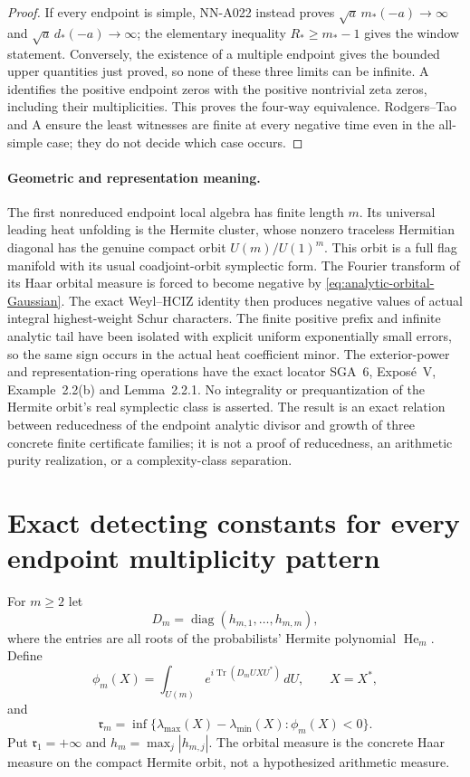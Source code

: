\begin{proof}
If every endpoint is simple, NN-A022 instead proves
$\sqrt a\,m_*(-a)\to\infty$ and
$\sqrt a\,d_*(-a)\to\infty$; the elementary inequality
$R_*\ge m_*-1$ gives the window statement. Conversely, the existence
of a multiple endpoint gives the bounded upper quantities just proved,
so none of these three limits can be infinite. A identifies the
positive endpoint zeros with the positive nontrivial zeta zeros,
including their multiplicities. This proves the four-way equivalence.
Rodgers--Tao and A ensure the least witnesses are finite at every
negative time even in the all-simple case; they do not decide which
case occurs.
\end{proof}

\paragraph{Geometric and representation meaning.}
The first nonreduced endpoint local algebra has finite length $m$.
Its universal leading heat unfolding is the Hermite cluster, whose
nonzero traceless Hermitian diagonal has the genuine compact orbit
$U(m)/U(1)^m$. This orbit is a full flag manifold with its usual
coadjoint-orbit symplectic form. The Fourier transform of its Haar
orbital measure is forced to become negative by
\eqref{eq:analytic-orbital-Gaussian}. The exact Weyl--HCIZ identity
then produces negative values of actual integral highest-weight
Schur characters. The finite positive prefix and infinite analytic
tail have been isolated with explicit uniform exponentially small
errors, so the same sign occurs in the actual heat coefficient minor.
The exterior-power and representation-ring operations have the exact
locator SGA~6, Expos\'e~V, Example~2.2(b) and Lemma~2.2.1.
No integrality or prequantization of the Hermite orbit's real symplectic
class is asserted. The result is an exact relation between reducedness
of the endpoint analytic divisor and growth of three concrete finite
certificate families; it is not a proof of reducedness, an arithmetic
purity realization, or a complexity-class separation.


\section{Exact detecting constants for every endpoint multiplicity pattern}
\label{sec:analytic-orbital-detection-constants}

\begin{definition}
For $m\ge2$ let
\[
 D_m=\operatorname{diag}(h_{m,1},\ldots,h_{m,m}),
\]
where the entries are all roots of the probabilists' Hermite polynomial
$\operatorname{He}_m$. Define
\[
 \phi_m(X)=\int_{U(m)}e^{i\operatorname{Tr}(D_mUXU^*)}\,dU,
                 \qquad X=X^*,
\]
and
\begin{equation}\label{eq:analytic-orbital-radius}
 \mathfrak r_m=
   \inf\{\lambda_{\max}(X)-\lambda_{\min}(X):\phi_m(X)<0\}.
\end{equation}
Put $\mathfrak r_1=+\infty$ and $h_m=\max_j|h_{m,j}|$.
The orbital measure is the concrete Haar measure on the compact
Hermite orbit, not a hypothesized arithmetic measure.
\end{definition}

